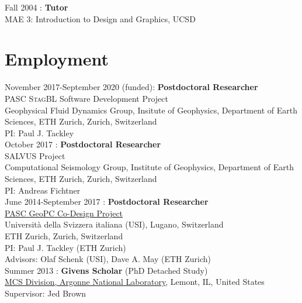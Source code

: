 \noindent Fall 2004 : \textbf{Tutor}\\
 MAE 3: Introduction to Design and Graphics, UCSD\\

\section*{Employment}

\noindent November 2017-September 2020 (funded): \textbf{Postdoctoral Researcher} \\
PASC \textsc{StagBL} Software Development Project \\
Geophysical Fluid Dynamics Group, Insitute of Geophysics, Department of Earth Sciences, ETH Zurich, Zurich, Switzerland \\
PI: Paul J. Tackley \\

\noindent October 2017 : \textbf{Postdoctoral Researcher}\\
\textsc{SALVUS} Project\\
Computational Seismology Group, Institute of Geophysics, Department of Earth Sciences, ETH Zurich, Zurich, Switzerland \\
PI: Andreas Fichtner \\

\noindent June 2014-September 2017 : \textbf{Postdoctoral Researcher} \\
\href{http://www.pasc-ch.org/projects/projects/geopc/}{PASC GeoPC Co-Design Project} \\
Universit\`{a} della Svizzera italiana (USI), Lugano, Switzerland \\
ETH Zurich, Zurich, Switzerland \\
PI: Paul J. Tackley (ETH Zurich) \\
Advisors: Olaf Schenk (USI), Dave A. May (ETH Zurich) \\


\noindent Summer 2013 : \textbf{Givens Scholar} (PhD Detached Study) \\
\href{http://www.mcs.anl.gov}{MCS Division, Argonne National Laboratory}, Lemont, IL, United States \\
Supervisor: Jed Brown \\

